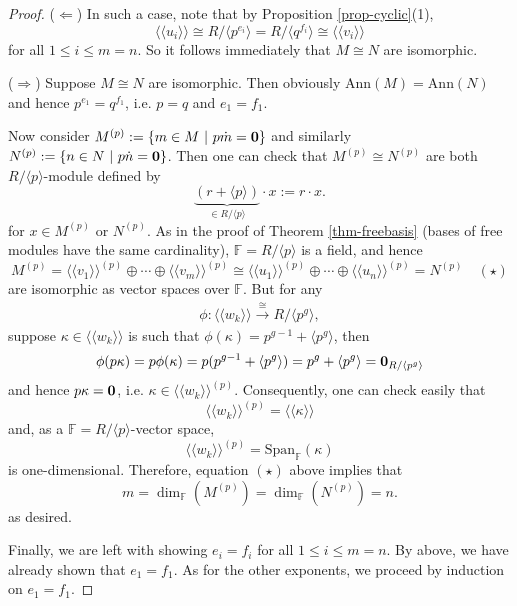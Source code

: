 \documentclass[12pt]{amsbook}
\begin{document}
\begin{proof}
    ($\Leftarrow$) In such a case, note that by Proposition \ref{prop-cyclic}(1), 
    $$\langle\langle u_i\rangle\rangle \cong R/\langle p^{e_i} \rangle = R/\langle q^{f_i} \rangle \cong \langle\langle v_i\rangle\rangle$$
    for all $1 \leq i \leq m = n$. So it follows immediately that $M \cong N$ are isomorphic.
    
    ($\Rightarrow$) Suppose $M \cong N$ are isomorphic. Then obviously $\mathrm{Ann}(M) = \mathrm{Ann}(N)$
    and hence $p^{e_1} = q^{f_1}$, i.e. $p = q$ and $e_1 = f_1$.

    Now consider $M^{(p)} := \{m \in M\ |\ p \dot m = {\bf 0}\}$ and similarly $N^{(p)} := \{n \in N\ |\ p \dot n = {\bf 0}\}$. Then one can check that
    $M^{(p)} \cong N^{(p)}$ are both $R/\langle p \rangle$-module defined by
    $$\underbrace{(r + \langle p \rangle)}_{\in R/\langle p \rangle} \cdot x := r\cdot x.$$
    for $x \in M^{(p)}$ or $N^{(p)}$. As in the proof of Theorem \ref{thm-freebasis} (bases of free modules have the same cardinality), $\mathbb{F} = R/\langle p \rangle$ is a field, and hence
    $$M^{(p)} = \langle\langle v_1\rangle\rangle^{(p)} \oplus\cdots\oplus\langle\langle v_m\rangle\rangle^{(p)} \cong \langle\langle u_1\rangle\rangle^{(p)} \oplus\cdots\oplus\langle\langle u_n\rangle\rangle^{(p)} = N^{(p)} \quad (\star)$$
are isomorphic as vector spaces over $\mathbb{F}$. But for any 
\begin{align*}
\phi: \langle \langle w_k \rangle \rangle \xrightarrow{\cong} R/\langle p^{g} \rangle, 
\end{align*}
suppose $\kappa \in \langle \langle w_k \rangle \rangle$
is such that 
$\phi(\kappa) = p^{g-1} + \langle p^{g} \rangle$, then 
$$\phi(p\kappa) = p \phi(\kappa) = p(p^{g-1} + \langle p^{g} \rangle) = p^g + \langle p^{g} \rangle = {\bf 0}_{R/\langle p^{g} \rangle}$$
and hence $p\kappa = {\bf 0}$, i.e. $\kappa \in \langle \langle w_k \rangle \rangle^{(p)}$. Consequently, one can check easily that
$$\langle\langle w_k \rangle\rangle^{(p)} = \langle\langle \kappa \rangle\rangle$$
and, as a $\mathbb{F} = R/\langle p \rangle$-vector space, 
$$\langle\langle w_k \rangle\rangle^{(p)} = \mathrm{Span}_{\mathbb{F}}(\kappa)$$
is one-dimensional. Therefore, equation $(\star)$ above implies that 
$$m = \dim_{\mathbb{F}}(M^{(p)}) = \dim_{\mathbb{F}}(N^{(p)}) = n.$$ 
as desired.

Finally, we are left with showing $e_i = f_i$ for all $1 \leq i \leq m = n$. By above, we have already shown that $e_1 = f_1$. As for the other exponents, we proceed by induction on $e_1 = f_1$.


\end{proof}
\end{document}
